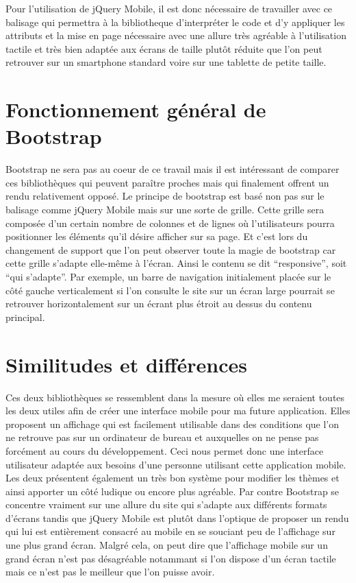\documentclass[a4paper,12pt,oneside]{sphinxmanual}
\begin{document}
Pour l'utilisation de jQuery Mobile, il est donc nécessaire de travailler avec ce balisage
qui permettra à la bibliotheque d'interpréter le code et d'y appliquer les
attributs et la mise en page nécessaire avec une allure très agréable à
l'utilisation tactile et très bien adaptée aux écrans de taille plutôt réduite que l'on
peut retrouver sur un smartphone standard voire sur une tablette de petite taille.


\section{Fonctionnement général de Bootstrap}
\label{Diff_xe9rence_jQM_boot:fonctionnement-general-de-bootstrap}
Bootstrap ne sera pas au coeur de ce travail mais il est intéressant de comparer
ces bibliothèques qui peuvent paraître proches mais qui finalement offrent un rendu
relativement opposé. Le principe de bootstrap est basé non pas sur le balisage
comme jQuery Mobile mais sur une sorte de grille. Cette grille sera composée d'un
certain nombre de colonnes et de lignes où l'utilisateurs pourra positionner les
éléments qu'il désire afficher sur sa page. Et c'est lors du changement de support
que l'on peut observer toute la magie de bootstrap car cette grille s'adapte elle-même
à l'écran. Ainsi le contenu se dit ``responsive'', soit ``qui s'adapte''. Par exemple,
un barre de navigation initialement placée sur le côté gauche verticalement si l'on consulte
le site sur un écran large pourrait se retrouver horizontalement sur un écrant plus
étroit au dessus du contenu principal.


\section{Similitudes et différences}
\label{Diff_xe9rence_jQM_boot:similitudes-et-differences}
Ces deux bibliothèques se ressemblent dans la mesure où elles me seraient toutes
les deux utiles afin de créer une interface mobile pour ma future application.
Elles proposent un affichage qui est facilement utilisable dans des conditions
que l'on ne retrouve pas sur un ordinateur de bureau et auxquelles on ne pense pas
forcément au cours du développement. Ceci nous permet donc une interface utilisateur
adaptée aux besoins d'une personne utilisant cette application mobile. Les deux
présentent également un très bon système pour modifier les thèmes et ainsi
apporter un côté ludique ou encore plus agréable.
Par contre Bootstrap se concentre vraiment sur une allure du site qui s'adapte
aux différents formats d'écrans tandis que jQuery Mobile est plutôt dans l'optique
de proposer un rendu qui lui est entièrement consacré au mobile en se souciant peu
de l'affichage sur une plus grand écran. Malgré cela, on peut dire que l'affichage
mobile sur un grand écran n'est pas désagréable notammant si l'on dispose d'un écran
tactile mais ce n'est pas le meilleur que l'on puisse avoir.
\end{document}
